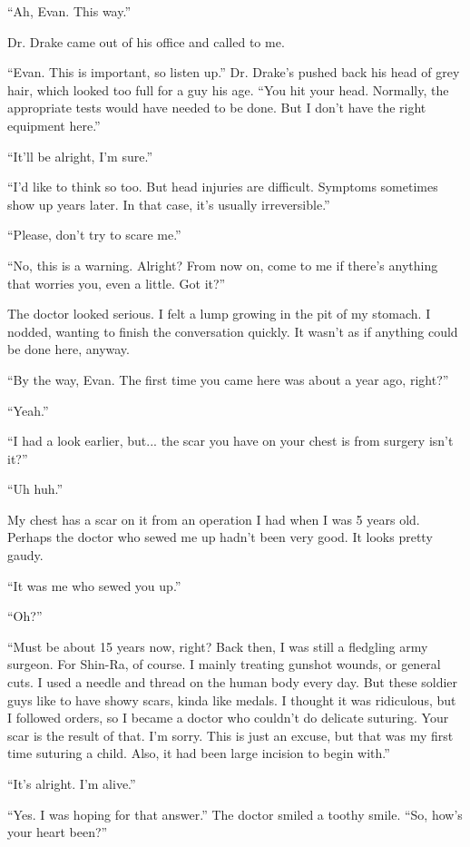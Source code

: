 \documentclass[oneside]{book}
\begin{document}
“Ah, Evan. This way.”

Dr. Drake came out of his office and called to me.

“Evan. This is important, so listen up.” Dr. Drake’s pushed back his head of grey hair, which looked too full for a guy his age. “You hit your head. Normally, the appropriate tests would have needed to be done. But I don’t have the right equipment here.”

“It’ll be alright, I’m sure.”

“I’d like to think so too. But head injuries are difficult. Symptoms sometimes show up years later. In that case, it’s usually irreversible.”

“Please, don’t try to scare me.”

“No, this is a warning. Alright? From now on, come to me if there’s anything that worries you, even a little. Got it?”

The doctor looked serious. I felt a lump growing in the pit of my stomach. I nodded, wanting to finish the conversation quickly. It wasn’t as if anything could be done here, anyway.

“By the way, Evan. The first time you came here was about a year ago, right?”

“Yeah.”

“I had a look earlier, but... the scar you have on your chest is from surgery isn’t it?”

“Uh huh.”

My chest has a scar on it from an operation I had when I was 5 years old. Perhaps the doctor who sewed me up hadn’t been very good. It looks pretty gaudy.

“It was me who sewed you up.”

“Oh?”

“Must be about 15 years now, right? Back then, I was still a fledgling army surgeon. For Shin-Ra, of course. I mainly treating gunshot wounds, or general cuts. I used a needle and thread on the human body every day. But these soldier guys like to have showy scars, kinda like medals. I thought it was ridiculous, but I followed orders, so I became a doctor who couldn’t do delicate suturing. Your scar is the result of that. I’m sorry. This is just an excuse, but that was my first time suturing a child. Also, it had been large incision to begin with.”

“It’s alright. I’m alive.”

“Yes. I was hoping for that answer.” The doctor smiled a toothy smile. “So, how’s your heart been?”
\end{document}
